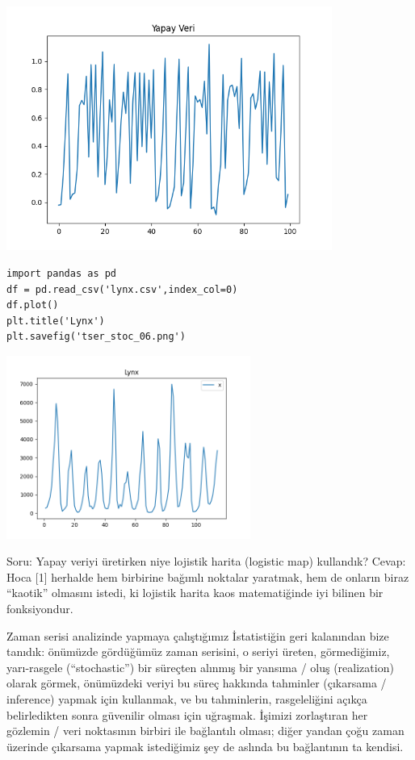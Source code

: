 \documentclass[12pt,fleqn]{article}\usepackage{../../common}
\begin{document}
\includegraphics[height=8cm]{tser_stoc_05.png}

\begin{verbatim}
import pandas as pd
df = pd.read_csv('lynx.csv',index_col=0)
df.plot()
plt.title('Lynx')
plt.savefig('tser_stoc_06.png')
\end{verbatim}

\includegraphics[height=6cm]{tser_stoc_06.png}

Soru: Yapay veriyi üretirken niye lojistik harita (logistic map) kullandık?
Cevap: Hoca [1] herhalde hem birbirine bağımlı noktalar yaratmak, hem de onların
biraz ``kaotik'' olmasını istedi, ki lojistik harita kaos matematiğinde iyi
bilinen bir fonksiyondur.

Zaman serisi analizinde yapmaya çalıştığımız İstatistiğin geri kalanından bize
tanıdık: önümüzde gördüğümüz zaman serisini, o seriyi üreten, görmediğimiz,
yarı-rasgele (``stochastic'') bir süreçten alınmış bir yansıma / oluş
(realization) olarak görmek, önümüzdeki veriyi bu süreç hakkında tahminler
(çıkarsama / inference) yapmak için kullanmak, ve bu tahminlerin, rasgeleliğini
açıkça belirledikten sonra güvenilir olması için uğraşmak. İşimizi zorlaştıran
her gözlemin / veri noktasının birbiri ile bağlantılı olması; diğer yandan çoğu
zaman üzerinde çıkarsama yapmak istediğimiz şey de aslında bu bağlantının ta
kendisi.
\end{document}
